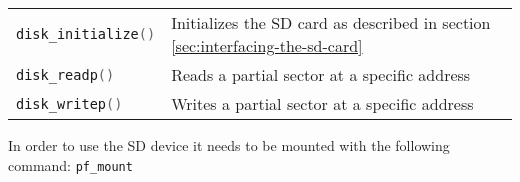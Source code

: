 \begin{tabular}{ll}
    \lstinline[language=C]!disk_initialize()! &  Initializes the SD card as described in section \ref{sec:interfacing-the-sd-card}\\
    \lstinline[language=C]!disk_readp()! & Reads a partial sector at a specific address\\
    \lstinline[language=C]!disk_writep()! & Writes a partial sector at a specific address\\
\end{tabular}

In order to use the SD device it needs to be mounted with the following command:  \lstinline[language=C]!pf_mount! 